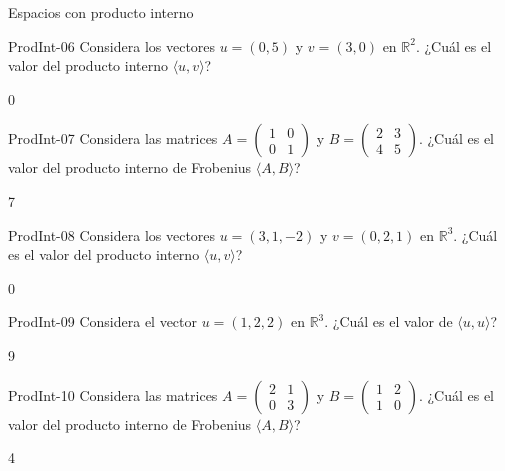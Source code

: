 \documentclass[a4,11pt]{aleph-notas}
\begin{document}
\begin{quiz}{Espacios con producto interno}
\begin{numerical}[tolerance=0]%
    {ProdInt-06}
    Considera los vectores \(u=(0,5)\) y \(v=(3,0)\) en \(\mathbb{R}^2\). ¿Cuál es el valor del producto interno \(\langle u,v\rangle\)?
    \item 0
\end{numerical}

\begin{numerical}[tolerance=0]%
    {ProdInt-07}
    Considera las matrices \(A=\begin{pmatrix}1&0\\0&1\end{pmatrix}\) y \(B=\begin{pmatrix}2&3\\4&5\end{pmatrix}\). ¿Cuál es el valor del producto interno de Frobenius \(\langle A,B\rangle\)?
    \item 7
\end{numerical}

\begin{numerical}[tolerance=0]%
    {ProdInt-08}
    Considera los vectores \(u=(3,1,-2)\) y \(v=(0,2,1)\) en \(\mathbb{R}^3\). ¿Cuál es el valor del producto interno \(\langle u,v\rangle\)?
    \item 0
\end{numerical}

\begin{numerical}[tolerance=0]%
    {ProdInt-09}
    Considera el vector \(u=(1,2,2)\) en \(\mathbb{R}^3\). ¿Cuál es el valor de \(\langle u,u\rangle\)?
    \item 9
\end{numerical}

\begin{numerical}[tolerance=0]%
    {ProdInt-10}
    Considera las matrices \(A=\begin{pmatrix}2&1\\0&3\end{pmatrix}\) y \(B=\begin{pmatrix}1&2\\1&0\end{pmatrix}\). ¿Cuál es el valor del producto interno de Frobenius \(\langle A,B\rangle\)?
    \item 4
\end{numerical}

\end{quiz}
\end{document}
